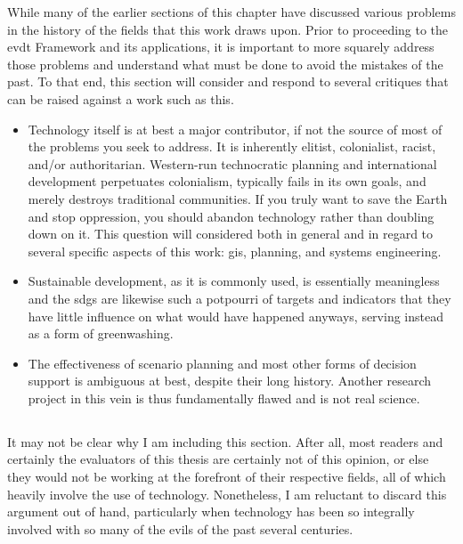 While many of the earlier sections of this chapter have discussed various problems in the history of the fields that this work draws upon. Prior to proceeding to the \ac{evdt} Framework and its applications, it is important to more squarely address those problems and understand what must be done to avoid the mistakes of the past. To that end, this section will consider and respond to several critiques that can be raised against a work such as this.

\begin{itemize} \setlength{\itemsep}{0pt} \setlength{\parskip}{0pt} 
	\item{Technology itself is at best a major contributor, if not the source of most of the problems you seek to address. It is inherently elitist, colonialist, racist, and/or authoritarian. Western-run technocratic planning and international development perpetuates colonialism, typically fails in its own goals, and merely destroys traditional communities. If you truly want to save the Earth and stop oppression, you should abandon technology rather than doubling down on it. This question will considered both in general and in regard to several specific aspects of this work: \ac{gis}, planning, and systems engineering.}	
	\item{Sustainable development, as it is commonly used, is essentially meaningless and the \acp{sdg} are likewise such a potpourri of targets and indicators that they have little influence on what would have happened anyways, serving instead as a form of greenwashing.}
	\item{The effectiveness of scenario planning and most other forms of decision support is ambiguous at best, despite their long history. Another research project in this vein is thus fundamentally flawed and is not real science.}	
\end{itemize}


\subsection{}

It may not be clear why I am including this section. After all, most readers and certainly the evaluators of this thesis are certainly not of this opinion, or else they would not be working at the forefront of their respective fields, all of which heavily involve the use of technology. Nonetheless, I am reluctant to discard this argument out of hand, particularly when technology has been so integrally involved with so many of the evils of the past several centuries.

